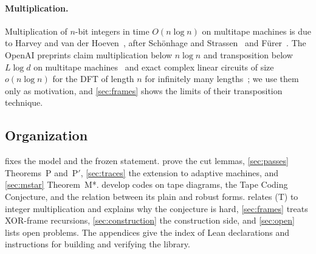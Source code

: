 \paragraph{Multiplication.} Multiplication of $n$-bit integers in time $O(n\log n)$ on multitape machines is due to Harvey and van der
Hoeven~\cite{HvdH2021}, after Sch\"onhage and Strassen~\cite{SchonhageStrassen1971} and F\"urer~\cite{Furer2009}. The
OpenAI preprints claim multiplication below $n\log n$ and transposition below $L\log d$ on multitape machines~\cite{OpenAI2026mult} and exact complex linear circuits of size $o(n\log n)$ for the DFT of length $n$ for infinitely many lengths~\cite{OpenAI2026fourier};
we use them only as motivation, and \cref{sec:frames} shows the limits of their transposition technique.

\subsection{Organization}

 fixes the model and the frozen statement.  prove the cut lemmas,
\cref{sec:passes} Theorems~P and~P$'$, \cref{sec:traces} the extension to adaptive machines, and \cref{sec:mstar}
Theorem~M*.  develop codes on tape diagrams, the Tape Coding Conjecture,
and the relation between its plain and robust forms.  relates (T) to integer multiplication and explains why the conjecture is hard,
\cref{sec:frames} treats XOR-frame recursions, \cref{sec:construction} the construction side, and \cref{sec:open} lists
open problems. The appendices give the index of Lean declarations and instructions for building and verifying the
library.
